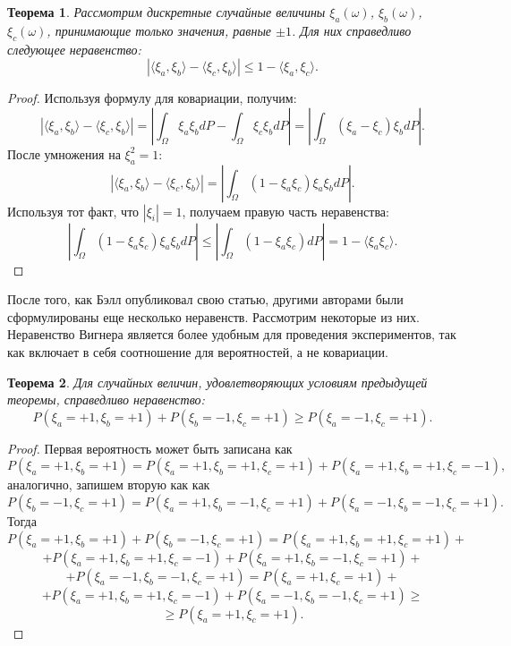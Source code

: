 \documentclass[11pt]{article}
\newtheorem{theorem}{Теорема}[section]
\begin{document}
\begin{theorem}
Рассмотрим дискретные случайные величины $\xi_a(\omega)$, $\xi_b(\omega)$, $\xi_c(\omega)$, принимающие только значения, равные $\pm 1$. Для них справедливо следующее неравенство:
\[
| \langle\xi_a,\xi_b\rangle -  \langle\xi_c,\xi_b\rangle | \leq 1 - \langle\xi_a,\xi_c\rangle.
\]
\end{theorem}

\begin{proof}
Используя формулу для ковариации, получим:
\[
| \langle\xi_a,\xi_b\rangle -  \langle\xi_c,\xi_b\rangle | = \left| \int_\Omega\xi_a\xi_b dP - \int_\Omega\xi_c\xi_b dP\right| = \left|\int_\Omega (\xi_a - \xi_c)\xi_bdP \right|.
\]
После умножения на $\xi_a^2 = 1$:
\[
| \langle\xi_a,\xi_b\rangle -  \langle\xi_c,\xi_b\rangle | = \left|\int_\Omega (1 - \xi_a\xi_c)\xi_a\xi_bdP \right|.
\]
Используя тот факт, что $|\xi_i| = 1$, получаем правую часть неравенства:
\[
\left|\int_\Omega (1 - \xi_a\xi_c)\xi_a\xi_bdP \right| \leq  \left|\int_\Omega (1 - \xi_a\xi_c)dP\right| = 1 - \langle \xi_a\xi_c\rangle.
\]
\end{proof}

После того, как Бэлл опубликовал свою статью, другими авторами были сформулированы еще несколько неравенств. Рассмотрим некоторые из них. Неравенство Вигнера является более удобным для проведения экспериментов, так как включает в себя соотношение для вероятностей, а не ковариации. 
\begin{theorem}
Для случайных величин, удовлетворяющих условиям предыдущей теоремы, справедливо неравенство:
\[
P(\xi_a = +1, \xi_b = +1) + P(\xi_b = -1, \xi_c = +1) \geq P(\xi_a = -1, \xi_c = +1).
\]
\end{theorem}

\begin{proof}
Первая вероятность может быть записана как
\[
P(\xi_a = +1, \xi_b = +1) = P(\xi_a = +1, \xi_b = +1, \xi_c = +1) + P(\xi_a = +1, \xi_b = +1, \xi_c = -1),
\]
аналогично, запишем вторую как как
\[
P(\xi_b = -1, \xi_c = +1) = P(\xi_a = +1, \xi_b = -1, \xi_c = +1) + P(\xi_a = -1, \xi_b = -1, \xi_c = +1).
\]
Тогда
\[
P(\xi_a = +1, \xi_b = +1) + P(\xi_b = -1, \xi_c = +1) = P(\xi_a = +1, \xi_b = +1, \xi_c = +1) + 
\] 
\[
 + P(\xi_a = +1, \xi_b = +1, \xi_c = -1) + P(\xi_a = +1, \xi_b = -1, \xi_c = +1) + 
\]
\[
 + P(\xi_a = -1, \xi_b = -1, \xi_c = +1) =  P(\xi_a = +1, \xi_c = +1) +
\]
\[
+  P(\xi_a = +1, \xi_b = +1, \xi_c = -1) + P(\xi_a = -1, \xi_b = -1, \xi_c = +1)\geq
\]
\[
 \geq P(\xi_a = +1, \xi_c = +1).
\]
\end{proof}
\end{document}
